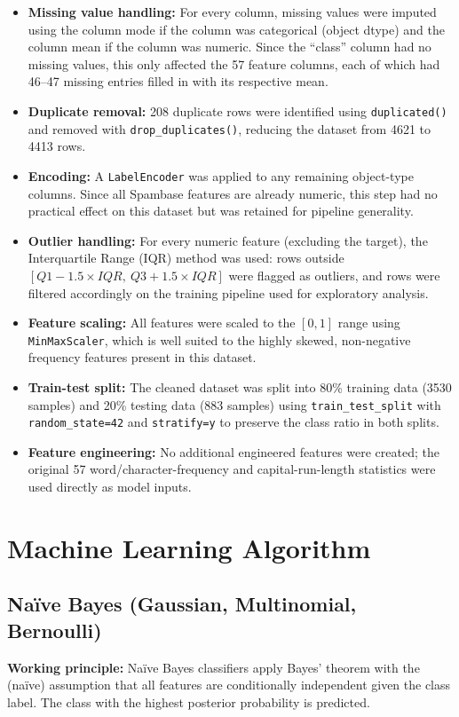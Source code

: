 \documentclass[12pt,a4paper]{article}
\begin{document}
\begin{itemize}
\item \textbf{Missing value handling:} For every column, missing values were imputed using the column mode if the column was categorical (object dtype) and the column mean if the column was numeric. Since the ``class'' column had no missing values, this only affected the 57 feature columns, each of which had 46--47 missing entries filled in with its respective mean.
\item \textbf{Duplicate removal:} 208 duplicate rows were identified using \texttt{duplicated()} and removed with \texttt{drop\_duplicates()}, reducing the dataset from 4621 to 4413 rows.
\item \textbf{Encoding:} A \texttt{LabelEncoder} was applied to any remaining object-type columns. Since all Spambase features are already numeric, this step had no practical effect on this dataset but was retained for pipeline generality.
\item \textbf{Outlier handling:} For every numeric feature (excluding the target), the Interquartile Range (IQR) method was used: rows outside $[Q1 - 1.5 \times IQR,\ Q3 + 1.5 \times IQR]$ were flagged as outliers, and rows were filtered accordingly on the training pipeline used for exploratory analysis.
\item \textbf{Feature scaling:} All features were scaled to the $[0,1]$ range using \texttt{MinMaxScaler}, which is well suited to the highly skewed, non-negative frequency features present in this dataset.
\item \textbf{Train-test split:} The cleaned dataset was split into 80\% training data (3530 samples) and 20\% testing data (883 samples) using \texttt{train\_test\_split} with \texttt{random\_state=42} and \texttt{stratify=y} to preserve the class ratio in both splits.
\item \textbf{Feature engineering:} No additional engineered features were created; the original 57 word/character-frequency and capital-run-length statistics were used directly as model inputs.
\end{itemize}

\section{Machine Learning Algorithm}

\subsection*{Na\"ive Bayes (Gaussian, Multinomial, Bernoulli)}
\textbf{Working principle:} Na\"ive Bayes classifiers apply Bayes' theorem with the (na\"ive) assumption that all features are conditionally independent given the class label. The class with the highest posterior probability is predicted.
\end{document}
